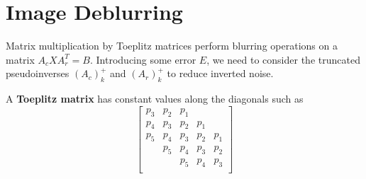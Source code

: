 \section{Image Deblurring}

\begin{bigidea}
Matrix multiplication by Toeplitz matrices perform blurring operations on a matrix $A_cXA_r^T = B$. Introducing some error $E$, we need to consider the truncated pseudoinverses $(A_c)^+_k$ and $(A_r)^+_k$ to reduce inverted noise.
\end{bigidea}

\begin{definition}
A {\bf Toeplitz matrix} \cite[p.34]{HNO} has constant values along the diagonals such as
$$
\begin{bmatrix}
p_3 & p_2 & p_1 & & \\
p_4 & p_3 & p_2 & p_1 & \\
p_5 & p_4 & p_3 & p_2 & p_1 \\
& p_5 & p_4 & p_3 & p_2 \\
& & p_5 & p_4 & p_3 \\
\end{bmatrix}
$$
\end{definition}

